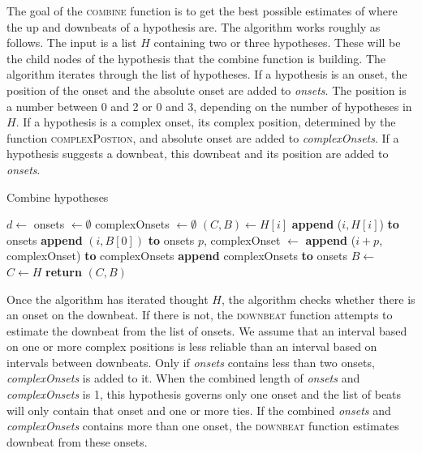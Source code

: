 The goal of the \textsc{combine} function is to get the best possible estimates of where the up and downbeats of a hypothesis are. The algorithm works roughly as follows. The input is a list $H$ containing two or three hypotheses. These will be the child nodes of the hypothesis that the combine function is building. The algorithm iterates through the list of hypotheses. If a hypothesis is an onset, the position of the onset and the absolute onset are added to \textit{onsets}. The position is a number between 0 and 2 or 0 and 3, depending on the number of hypotheses in $H$. If a hypothesis is a complex onset, its complex position, determined by the function \textsc{complexPostion}, and absolute onset are added to \textit{complexOnsets}. If a hypothesis suggests a downbeat, this downbeat and its position are added to \textit{onsets}.

\begin{algorithm}
\caption{Combine hypotheses}
\label{alg:combination}
\begin{algorithmic}
	\State $d \leftarrow$ 
	\State onsets $\leftarrow \emptyset$
	\State complexOnsets $\leftarrow \emptyset$
		\State $(C, B) \leftarrow H[i]$
			\State \textbf{append} ($i, H[i]$) \textbf{to} onsets
		\Else
				\State \textbf{append} $(i, B[0])$ \textbf{to} onsets
			\Else
				\State $p$, complexOnset $\leftarrow$ 
				\State \textbf{append} ($i + p$, complexOnset) \textbf{to} complexOnsets
			\EndIf
		\EndIf
	\EndFor
		\State \textbf{append} complexOnsets \textbf{to} onsets
	\EndIf
	\State $B \leftarrow$ 
	\State $C \leftarrow H$
	\State \textbf{return} $(C, B)$
\EndFunction
\end{algorithmic}
\end{algorithm}

Once the algorithm has iterated thought $H$, the algorithm checks whether there is an onset on the downbeat. If there is not, the \textsc{downbeat} function attempts to estimate the downbeat from the list of onsets. We assume that an interval based on one or more complex positions is less reliable than an interval based on intervals between downbeats. Only if \textit{onsets} contains less than two onsets, \textit{complexOnsets} is added to it. When the combined length of \textit{onsets} and \textit{complexOnsets} is 1, this hypothesis governs only one onset and the list of beats will only contain that onset and one or more ties. If the combined \textit{onsets} and \textit{complexOnsets} contains more than one onset, the \textsc{downbeat} function estimates downbeat from these onsets.

